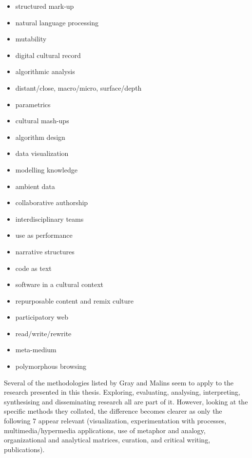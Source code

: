 \begin{multicols}{2}\raggedright
\begin{itemize}
  \item structured mark-up
  \item	natural language processing
  \item	mutability
  \item	digital cultural record
  \item	algorithmic analysis
  \item distant/close, macro/micro, surface/depth
  \item parametrics
  \item	cultural mash-ups
  \item	algorithm design
  \item data visualization
  \item	modelling knowledge
  \item	ambient data
  \item	collaborative authorship
  \item	interdisciplinary teams
  \item	use as performance
  \item narrative structures
  \item	code as text
  \item	software in a cultural context
  \item repurposable content and remix culture
  \item participatory web
  \item	read/write/rewrite
  \item	meta-medium
  \item	polymorphous browsing
\end{itemize}
\end{multicols}

\spirals

Several of the methodologies listed by Gray and Malins \autocite*{Gray2004} seem to apply to the research presented in this thesis. Exploring, evaluating, analysing, interpreting, synthesising and disseminating research all are part of it. However, looking at the specific methods they collated, the difference becomes clearer as only the following 7 appear relevant (visualization, experimentation with processes, multimedia/hypermedia applications, use of metaphor and analogy, organizational and analytical matrices, curation, and critical writing, publications).

